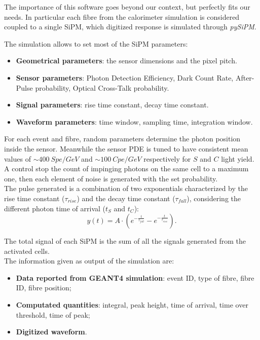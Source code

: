The importance of this software goes beyond our context, but perfectly fits our needs. In particular each fibre from the calorimeter simulation is considered coupled to a single SiPM, which digitized response is simulated through \textit{pySiPM}.

The simulation allows to set most of the SiPM parameters:
\begin{itemize}
	\item \textbf{Geometrical parameters}: the sensor dimensions and the pixel pitch.
	\item \textbf{Sensor parameters}: Photon Detection Efficiency, Dark Count Rate, After-Pulse probability, Optical Cross-Talk probability.
	\item \textbf{Signal parameters}: rise time constant, decay time constant.
	\item \textbf{Waveform parameters}: time window, sampling time, integration window.
\end{itemize}

For each event and fibre, random parameters determine the photon position inside the sensor. Meanwhile the sensor PDE is tuned to have consistent mean values of $\sim 400\ Spe/GeV$ and $\sim 100\ Cpe/GeV$ respectively for $S$ and $C$ light yield.
A control stop the count of impinging photons on the same cell to a maximum one, then each element of noise is generated with the set probability.\\
The pulse generated is a combination of two exponentials characterized by the rise time constant ($\tau_{rise}$) and the decay time constant ($\tau_{fall}$), considering the different photon time of arrival ($t_S$ and $t_C$):
\begin{equation}
	y(t)= A \cdot \left( e^{-\frac{t}{\tau_{fall}}} - e^{-\frac{t}{\tau_{rise}}}\right).
	\label{form:resp_func}
\end{equation}

The total signal of each SiPM is the sum of all the signals generated from the activated cells.\\

The information given as output of the simulation are:
\begin{itemize}
	\item \textbf{Data reported from GEANT4 simulation}: event ID, type of fibre, fibre ID, fibre position;
	\item \textbf{Computated quantities}: integral, peak height, time of arrival, time over threshold, time of peak;
	\item \textbf{Digitized waveform}.
\end{itemize}

